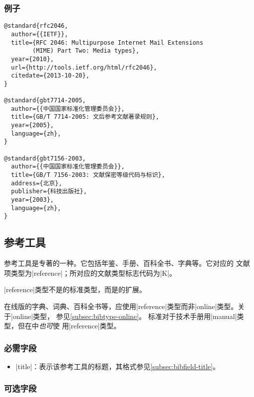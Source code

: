 \subsubsection{例子}

\begin{verbatim}
@standard{rfc2046,
  author={{IETF}},
  title={RFC 2046: Multipurpose Internet Mail Extensions 
        (MIME) Part Two: Media types},
  year={2010},
  url={http://tools.ietf.org/html/rfc2046},
  citedate={2013-10-20},
}

@standard{gbt7714-2005,
  author={{中国国家标准化管理委员会}},
  title={GB/T 7714-2005: 文后参考文献著录规则},
  year={2005},
  language={zh},
}

@standard{gbt7156-2003,
  author={{中国国家标准化管理委员会}},
  title={GB/T 7156-2003: 文献保密等级代码与标识},
  address={北京},
  publisher={科技出版社},
  year={2003},
  language={zh},
}
\end{verbatim}


\subsection{参考工具}\label{subsec:bibtype-reference}

参考工具是专著的一种。它包括年鉴、手册、百科全书、字典等\cite{gbt3469-1983}。它对应的
{\BibTeX}文献项类型为|reference|；所对应的文献类型标志代码为|K|\cite{gbt3469-1983}。

|reference|类型不是{\BibTeX}的标准类型，而是{\njuthesis}的扩展。

\begin{note}
在线版的字典、词典、百科全书等，应使用|reference|类型而非|online|类型。关于|online|类型，
参见\ref{subsec:bibtype-online}。
标准{\BibTeX}对于技术手册用|manual|类型，但在{\njuthesis}中\emph{也可}使
用|reference|类型。
\end{note}

\subsubsection{必需字段}

\begin{itemize}
\item |title|：表示该参考工具的标题，其格式参见\ref{subsec:bibfield-title}。
\end{itemize}

\subsubsection{可选字段}

